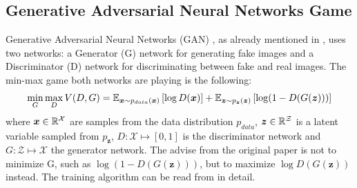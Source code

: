 
\subsection{Generative Adversarial Neural Networks Game}\label{sec:nn_theory_gan}
\thesisStateNew
Generative Adversarial Neural Networks (GAN) \cite{Goodfellow2014}, as already mentioned in , uses two networks: a Generator (G) network for generating fake images and a Discriminator (D) network for discriminating between fake and real images.
The min-max game both networks are playing is the following:
\begin{equation}\label{eq:nn_theory_gan}
  \underset{G}{\min} \, \underset{D}{\max} \, V(D, G) = \mathbb{E}_{\bm{x} \sim p_{data}(\bm{x})}\left[ \log D(\bm{x}) \right] + 
    \mathbb{E}_{\bm{z} \sim p_{\bm{z}}(\bm{z})}\left[ \log (1 - D(G(\bm{z}))) \right]
\end{equation}
where $\bm{x} \in \mathbb{R}^\mathcal{X}$ are samples from the data distribution $p_{data}$, $\bm{z} \in \mathbb{R}^\mathcal{Z}$ is a latent variable sampled from $p_{\bm{z}}$, $D: \mathcal{X} \mapsto [0, 1]$ is the discriminator network and $G: \mathcal{Z} \mapsto \mathcal{X}$ the generator network.
The advise from the original paper is not to minimize G, such as $\log (1 - D(G(\bm{z})))$, but to maximize $\log D(G(\bm{z}))$ instead.
The training algorithm can be read from \cite{Goodfellow2014} in detail.